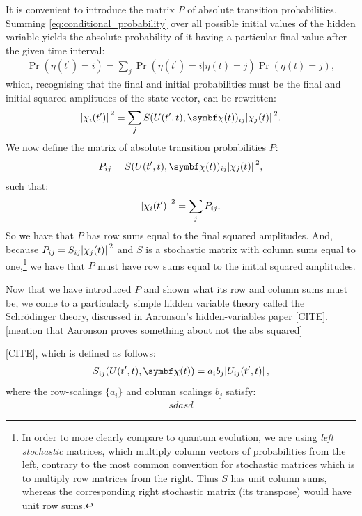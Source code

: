 It is convenient to introduce the matrix $P$ of absolute transition probabilities. Summing \eqref{eq:conditional_probability} over all possible initial values of the hidden variable yields the absolute probability of it having a particular final value after the given time interval:
\begin{align}
\Pr(\eta(t^\prime){=}i) 
= \sum_j \Pr(\eta(t^\prime){=}i|\eta(t){=}j) \Pr(\eta(t){=}j),
\end{align}
which, recognising that the final and initial probabilities must be the final and initial squared amplitudes of the state vector, can be rewritten:
\begin{align}
\abs{\chi_i(t^\prime)}^2
= \sum_j S(U(t^\prime, t), \vec\chi(t))_{ij} \abs{\chi_j(t)}^2.
\end{align}
We now define the matrix of absolute transition probabilities $P$:
\begin{align}
P_{ij} = S(U(t^\prime, t), \vec\chi(t))_{ij} \abs{\chi_j(t)}^2,
\end{align}
such that:
\begin{align}
\abs{\chi_i(t^\prime)}^2
= \sum_j P_{ij}.
\end{align}
So we have that $P$ has row sums equal to the final squared amplitudes.
And, because $P_{ij} = S_{ij}\abs{\chi_j(t)}^2$ and $S$ is a stochastic matrix with column sums equal to one,\footnote{In order to more clearly compare to quantum evolution, we are using \emph{left stochastic} matrices, which multiply column vectors of probabilities from the left, contrary to the most common convention for stochastic matrices which is to multiply row matrices from the right. Thus $S$ has unit column sums, whereas the corresponding right stochastic matrix (its transpose) would have unit row sums.} we have that $P$ must have row sums equal to the initial squared amplitudes.

Now that we have introduced $P$ and shown what its row and column sums must be, we come to a particularly simple hidden variable theory called the Schr\"odinger theory, discussed in Aaronson's hidden-variables paper [CITE]. [mention that Aaronson proves something about not the abs squared]


[CITE], which is defined as follows:
\begin{align}
S_{ij}(U(t^\prime, t), \vec\chi(t)) = a_i b_j \abs{U_{ij}(t^\prime, t)},
\end{align}
where the row-scalings $\{a_i\}$ and column scalings ${b_j}$ satisfy:
\begin{align}
sdasd
\end{align}

